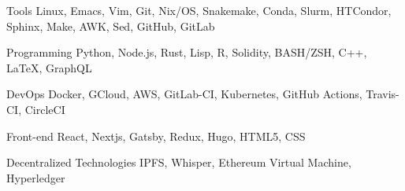 
\begin{cvskills}

	\cvskill
	{Tools} %
	{Linux, Emacs, Vim, Git, Nix/OS, Snakemake, Conda, Slurm, HTCondor, Sphinx, Make, AWK, Sed, GitHub, GitLab} %

	\cvskill
	{Programming} %
	{Python, Node.js, Rust, Lisp, R, Solidity, BASH/ZSH, C++, LaTeX, GraphQL} %

	\cvskill
	{DevOps} %
	{Docker, GCloud, AWS, GitLab-CI, Kubernetes, GitHub Actions, Travis-CI, CircleCI} %

	\cvskill
	{Front-end} %
	{React, Nextjs, Gatsby, Redux, Hugo, HTML5, CSS} %

	\cvskill
	{Decentralized Technologies} %
	{IPFS, Whisper, Ethereum Virtual Machine, Hyperledger} %


\end{cvskills}
